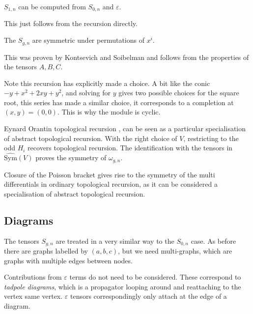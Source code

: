     \begin{corollary}
    \( S_{1,n} \) can be computed from \(S_{0,n}\) and \(\varepsilon\).
    \end{corollary}
    
    This just follows from the recursion directly.

    \begin{lem}
    The \( S_{g,n}\) are symmetric under permutations of \(x^i\).
    \end{lem}
    
    This was proven by Kontsevich and Soibelman and follows from the properties of the tensors \( A,B,C\).
    
    \begin{rem}
    Note this recursion has explicitly made a choice. A bit like the conic \( - y + x^2 + 2 x y + y^2\), and solving for \(y\) gives two possible choices for the square root, this series has made a similar choice, it corresponds to a completion at \((x,y)=(0,0)\). This is why the module is cyclic.
    \end{rem}

    Eynard Orantin topological recursion \cite{eynard_orantin}, can be seen as a particular specialisation of abstract topological recursion. With the right choice of \(V\), restricting to the odd \(H_i\) recovers topological recursion. The identification with the tensors in \(\widehat{\mathrm{Sym}}(V)\) proves the symmetry of \( \omega_{g,n}\).    

    
    Closure of the Poisson bracket gives rise to the symmetry of the multi differentials in ordinary topological recursion, as it can be considered a specialisation of abstract topological recursion.

    \subsection{Diagrams}
    The tensors \( S_{g,n}\) are treated in a very similar way to the \(S_{0,n}\) case. As before there are graphs labelled by \((a,b,c)\), but we need multi-graphs, which are graphs with multiple edges between nodes.

    Contributions from \( \varepsilon\) terms do not need to be considered. These correspond to \emph{tadpole diagrams}, which is a propagator looping around and reattaching to the vertex same vertex. \(\varepsilon\) tensors correspondingly only attach at the edge of a diagram.
    
